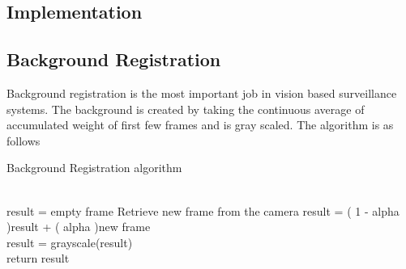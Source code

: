 \documentclass[12pt, a4paper]{article}
\begin{document}
\newpage
\begin{Large}\section{Implementation}\end{Large}
\begin{large}\subsection{Background Registration}\end{large}
\hspace{3cm}
Background registration is the most important job in vision based surveillance systems. The background is created by taking the continuous average of accumulated weight of first few frames and is gray scaled. The algorithm is as follows
\\
\begin{algorithm}
\caption{Background Registration algorithm}
\label{CHalgorithm}
\begin{algorithmic}[1]
\\result = empty frame
\State Retrieve new frame from the camera
\State result = ( 1 - alpha )result + ( alpha )new frame
\EndFor
\\result = grayscale(result)
\\return result
\EndProcedure
\end{algorithmic}
\end{algorithm}
\end{document}
